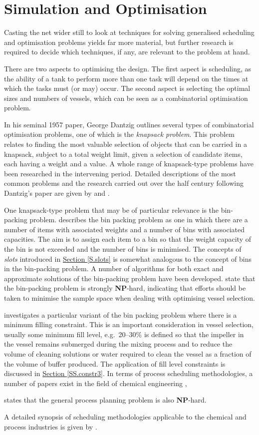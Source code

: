 \section{Simulation and Optimisation}\label{SS.simopt}

Casting the net wider still to look at techniques for solving generalised
scheduling and optimisation problems yields far more material, but further 
research is required to decide which techniques, if any, are relevant to the 
problem at hand.

There are two aspects to optimising the design.  The first aspect is scheduling,
as the ability of a tank to perform more than one task will depend on the times
at which the tasks must (or may) occur.  The second aspect is selecting the
optimal sizes and numbers of vessels, which can be seen as a combinatorial
optimisation problem.

In his seminal 1957 paper, George Dantzig \nocite{Dantzig:1957} outlines several
types of combinatorial optimisation problems, one of which is the
\emph{knapsack problem}.  This problem relates to finding the most valuable
selection of objects that can be carried in a knapsack, subject to a total
weight limit, given a selection of candidate items, each having a weight and a 
value.
A whole range of knapsack-type problems have been researched in the intervening
period.  Detailed descriptions of the most common problems and the research 
carried out over the half century following Dantzig's paper are given by 
\citet{Korte:2012} and \citet{Martello:1990}.

One knapsack-type problem that may be of particular relevance is the bin-packing
problem.  \citet{Martello:1990} describes the bin packing problem as one in
which there are a number of items with associated weights and a number of bins
with associated capacities.  The aim is to assign each item to a bin so that the
weight capacity of the bin is not exceeded and the number of bins is minimised.
The concepts of \emph{slots} introduced in
\hyperref[S.slots]{Section \ref*{S.slots}}
is somewhat analogous to the concept of bins in the bin-packing problem.
A number of algorithms for both exact and approximate solutions of the
bin-packing problem have been developed. \citet{Korte:2012} state that the
bin-packing problem is strongly \textbf{NP}-hard, indicating that efforts
should be taken to minimise the sample space when dealing with optimising vessel
selection.

\citet{Bettinelli:2010} investigates a particular variant of the bin packing
problem where there is a minimum filling constraint.  This is an important
consideration in vessel selection, usually some minimum fill level, e.g.\
20--30\% is defined so that the impeller in the vessel remains submerged during
the mixing process and to reduce the volume of cleaning solutions or water
required to clean the vessel as a fraction of the volume of buffer produced.
The application of fill level constraints is discussed in 
\hyperref[SS.constr3]{Section \ref*{SS.constr3}}.
In terms of process scheduling methodologies, a number of papers exist in the 
field of chemical engineering \citep{Ahmed:2000},

\citet{Ahmed:2000} states that the general process planning problem is also
\textbf{NP}-hard.

A detailed synopsis of scheduling methodologies applicable to the chemical 
and process industries is given by \citet{Harjunkoski:2014}.
